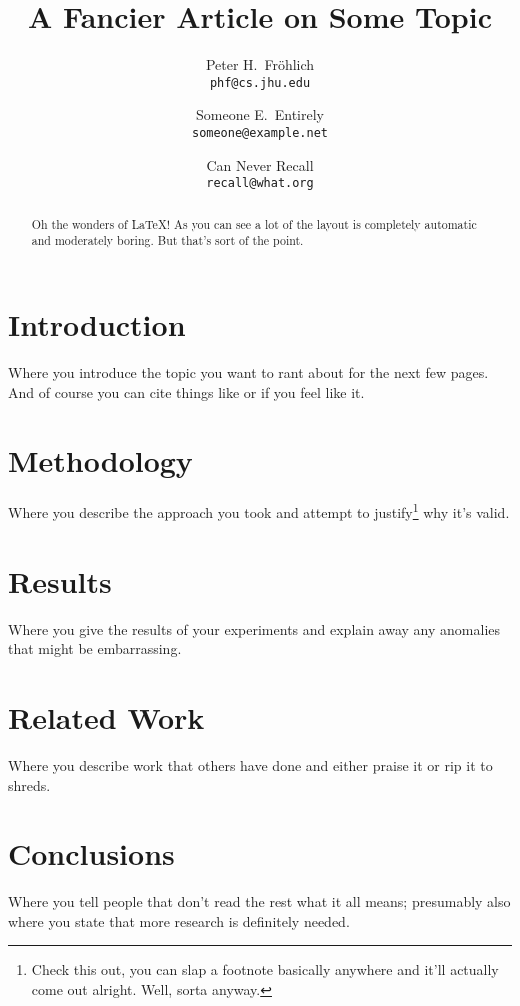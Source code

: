 \documentclass[letterpaper,11pt]{article}
\title{\textbf{A Fancier Article on Some Topic}}
\author{Peter H.\ Fr{\"o}hlich\\
\texttt{phf@cs.jhu.edu}
\and
Someone E.\ Entirely\\
\texttt{someone@example.net}
\and
Can Never Recall\\
\texttt{recall@what.org}}
\begin{document}
\maketitle

\begin{abstract}
Oh the wonders of \LaTeX!
As you can see a lot of the layout is completely
automatic and moderately boring.
But that's sort of the point.
\end{abstract}

\section{Introduction}

Where you introduce the topic you want to rant
about for the next few pages.
And of course you can cite things like
\cite{lamport94} or \cite{kant02} if you feel
like it.

\section{Methodology}

Where you describe the approach you took and
attempt to justify\footnote{Check this out,
you can slap a footnote basically anywhere
and it'll actually come out alright. Well,
sorta anyway.} why it's valid.

\section{Results}

Where you give the results of your experiments
and explain away any anomalies that might be
embarrassing.

\section{Related Work}

Where you describe work that others have done
and either praise it or rip it to shreds.

\section{Conclusions}

Where you tell people that don't read the rest
what it all means; presumably also where you
state that more research is definitely needed.
\end{document}
